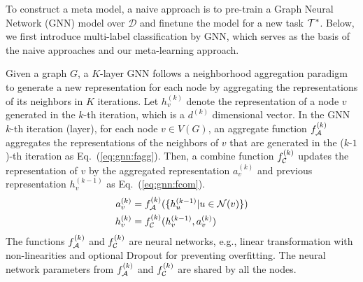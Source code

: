 To construct a meta model, a naive approach is to pre-train a Graph
Neural Network (GNN) model over $\mathcal{D}$ and finetune the model
for a new task $\mathcal{T}^*$. Below, we first introduce multi-label
classification by GNN, which serves as the basis of the naive
approaches and our meta-learning approach.

Given a graph $G$, a $K$-layer GNN follows a neighborhood aggregation paradigm to generate a new representation for each node by aggregating the representations of its neighbors in $K$ iterations. 
Let $h_v^{(k)}$ denote the representation of a node $v$ generated in the $k$-th iteration, which is a $d^{(k)}$ dimensional vector. 
In the GNN $k$-th iteration (layer), for each node $v \in V(G)$, an aggregate function $f_{\mathcal{A}}^{(k)}$ aggregates the representations of the neighbors of $v$ that are generated in the ($k$-$1$)-th iteration as Eq.~(\ref{eq:gnn:fagg}). 
Then, a combine function $f_{\mathcal{C}}^{(k)}$ updates the representation of $v$ by the aggregated representation $a_v^{(k)}$ and previous representation $h_v^{(k-1)}$ as Eq.~(\ref{eq:gnn:fcom}). 
\begin{align}
	a_v^{(k)} &= f_{\mathcal{A}}^{(k)}(\{ h_u^{(k - 1)} | u \in \mathcal{N}(v)\}) \label{eq:gnn:fagg} \\
	h_v^{(k)}  &= f_{\mathcal{C}}^{(k)}(h_v^{(k - 1)}, a_v^{(k)}) \label{eq:gnn:fcom}
\end{align}
The functions $f_{\mathcal{A}}^{(k)}$ and $f_{\mathcal{C}}^{(k)}$ are neural networks, e.g., linear transformation with non-linearities and optional Dropout for preventing overfitting. 
The neural network parameters from $f_{\mathcal{A}}^{(k)}$ and $f_{\mathcal{C}}^{(k)}$ are shared by all the nodes.
%

